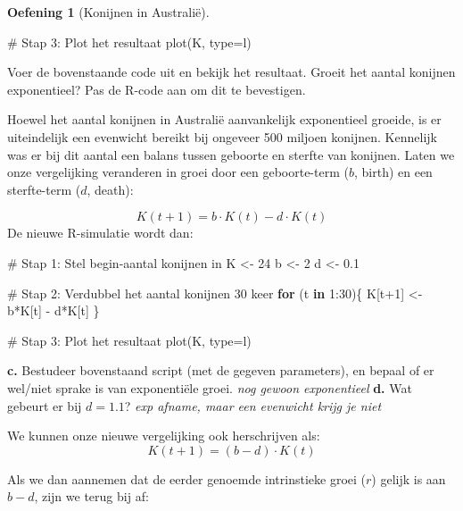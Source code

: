 \documentclass[
  a4paper,
]{scrbook}
\newenvironment{Shaded}{\begin{snugshade}}{\end{snugshade}}
\newcommand{\AttributeTok}[1]{\textcolor[rgb]{0.40,0.45,0.13}{#1}}
\newcommand{\CommentTok}[1]{\textcolor[rgb]{0.37,0.37,0.37}{#1}}
\newcommand{\ControlFlowTok}[1]{\textcolor[rgb]{0.00,0.23,0.31}{\textbf{#1}}}
\newcommand{\DecValTok}[1]{\textcolor[rgb]{0.68,0.00,0.00}{#1}}
\newcommand{\FloatTok}[1]{\textcolor[rgb]{0.68,0.00,0.00}{#1}}
\newcommand{\FunctionTok}[1]{\textcolor[rgb]{0.28,0.35,0.67}{#1}}
\newcommand{\NormalTok}[1]{\textcolor[rgb]{0.00,0.23,0.31}{#1}}
\newcommand{\OtherTok}[1]{\textcolor[rgb]{0.00,0.23,0.31}{#1}}
\newcommand{\SpecialCharTok}[1]{\textcolor[rgb]{0.37,0.37,0.37}{#1}}
\newcommand{\StringTok}[1]{\textcolor[rgb]{0.13,0.47,0.30}{#1}}
\theoremstyle{definition}
\newtheorem{exercise}{Oefening}[chapter]
\theoremstyle{remark}
\begin{document}
\begin{exercise}[Konijnen in
Australië]
\begin{Shaded}
\begin{Highlighting}[]
\CommentTok{\# Stap 3: Plot het resultaat}
\FunctionTok{plot}\NormalTok{(K, }\AttributeTok{type=}\StringTok{\textquotesingle{}l\textquotesingle{}}\NormalTok{)}
\end{Highlighting}
\end{Shaded}

Voer de bovenstaande code uit en bekijk het resultaat. Groeit het aantal
konijnen exponentieel? Pas de R-code aan om dit te bevestigen.

Hoewel het aantal konijnen in Australië aanvankelijk exponentieel
groeide, is er uiteindelijk een evenwicht bereikt bij ongeveer 500
miljoen konijnen. Kennelijk was er bij dit aantal een balans tussen
geboorte en sterfte van konijnen. Laten we onze vergelijking veranderen
in groei door een geboorte-term (\(b\), birth) en een sterfte-term
(\(d\), death):

\[
K(t+1) = b \cdot K(t) - d \cdot K(t)
\] De nieuwe R-simulatie wordt dan:

\begin{Shaded}
\begin{Highlighting}[]
\CommentTok{\# Stap 1: Stel begin{-}aantal konijnen in}
\NormalTok{K }\OtherTok{\textless{}{-}} \DecValTok{24}
\NormalTok{b }\OtherTok{\textless{}{-}} \DecValTok{2}
\NormalTok{d }\OtherTok{\textless{}{-}} \FloatTok{0.1}

\CommentTok{\# Stap 2: Verdubbel het aantal konijnen 30 keer}
\ControlFlowTok{for}\NormalTok{ (t }\ControlFlowTok{in} \DecValTok{1}\SpecialCharTok{:}\DecValTok{30}\NormalTok{)\{}
\NormalTok{  K[t}\SpecialCharTok{+}\DecValTok{1}\NormalTok{] }\OtherTok{\textless{}{-}}\NormalTok{ b}\SpecialCharTok{*}\NormalTok{K[t] }\SpecialCharTok{{-}}\NormalTok{ d}\SpecialCharTok{*}\NormalTok{K[t]}
\NormalTok{\}}

\CommentTok{\# Stap 3: Plot het resultaat}
\FunctionTok{plot}\NormalTok{(K, }\AttributeTok{type=}\StringTok{\textquotesingle{}l\textquotesingle{}}\NormalTok{)}
\end{Highlighting}
\end{Shaded}

\textbf{c.} Bestudeer bovenstaand script (met de gegeven parameters), en
bepaal of er wel/niet sprake is van exponentiële groei. \emph{nog gewoon
exponentieel} \textbf{d.} Wat gebeurt er bij \(d=1.1\)? \emph{exp
afname, maar een evenwicht krijg je niet}

We kunnen onze nieuwe vergelijking ook herschrijven als: \[
K(t+1) = (b-d) \cdot K(t) 
\]

Als we dan aannemen dat de eerder genoemde intrinstieke groei (\(r\))
gelijk is aan \(b-d\), zijn we terug bij af:


\end{exercise}
\end{document}
